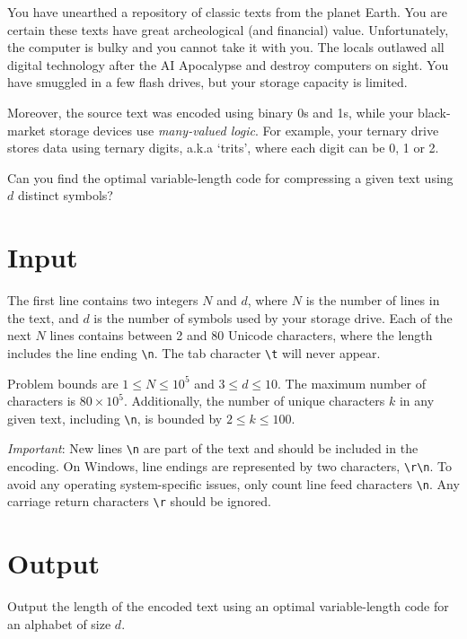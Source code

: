 
You have unearthed a repository of classic texts from the planet Earth. You are certain these texts have great archeological (and financial) value. Unfortunately, the computer is bulky and you cannot take it with you. The locals outlawed all digital technology after the AI Apocalypse and destroy computers on sight. You have smuggled in a few flash drives, but your storage capacity is limited.

Moreover, the source text was encoded using binary 0s and 1s, while your black-market storage devices use \textit{many-valued logic}. For example, your ternary drive stores data using ternary digits, a.k.a `trits', where each digit can be 0, 1 or 2.

Can you find the optimal variable-length code for compressing a given text using $d$ distinct symbols?

\section*{Input}
The first line contains two integers $N$ and $d$, where $N$ is the number of lines in the text, and $d$ is the number of symbols used by your storage drive. Each of the next $N$ lines contains between 2 and 80 Unicode characters, where the length includes the line ending \verb|\n|. The tab character \verb|\t| will never appear.

Problem bounds are $1 \leq N \leq 10^5$ and $3 \leq d \leq 10$. The maximum number of characters is $80 \times 10^5$. Additionally, the number of unique characters $k$ in any given text, including \verb|\n|, is bounded by $2 \leq k \leq 100$.

\textit{Important}: New lines \verb|\n| are part of the text and should be included in the encoding. On Windows, line endings are represented by two characters, \verb|\r\n|. To avoid any operating system-specific issues, only count line feed characters \verb|\n|. Any carriage return characters \verb|\r| should be ignored.

\section*{Output}
Output the length of the encoded text using an optimal variable-length code for an alphabet of size $d$.